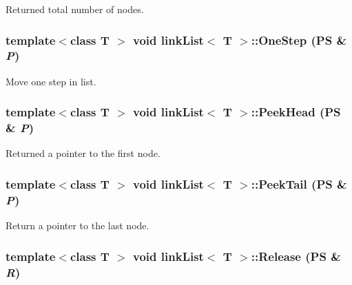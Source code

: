 Returned total number of nodes. \hypertarget{classlink_list_a2b549aa4a51e457cb8e0ef19e35978f3}{
\subsubsection[{OneStep}]{\setlength{\rightskip}{0pt plus 5cm}template$<$class T $>$ void {\bf linkList}$<$ T $>$::OneStep ({\bf PS} \& {\em P})}}
\label{classlink_list_a2b549aa4a51e457cb8e0ef19e35978f3}


Move one step in list. \hypertarget{classlink_list_a7a7cc9e8690c7e9c73d5b406cae066d3}{
\subsubsection[{PeekHead}]{\setlength{\rightskip}{0pt plus 5cm}template$<$class T $>$ void {\bf linkList}$<$ T $>$::PeekHead ({\bf PS} \& {\em P})}}
\label{classlink_list_a7a7cc9e8690c7e9c73d5b406cae066d3}


Returned a pointer to the first node. \hypertarget{classlink_list_a54c57c0f1491cca11b810c658d386c3a}{
\subsubsection[{PeekTail}]{\setlength{\rightskip}{0pt plus 5cm}template$<$class T $>$ void {\bf linkList}$<$ T $>$::PeekTail ({\bf PS} \& {\em P})}}
\label{classlink_list_a54c57c0f1491cca11b810c658d386c3a}


Return a pointer to the last node. \hypertarget{classlink_list_a24a989f008cb02dd4e452f4e5479d5cb}{
\subsubsection[{Release}]{\setlength{\rightskip}{0pt plus 5cm}template$<$class T $>$ void {\bf linkList}$<$ T $>$::Release ({\bf PS} \& {\em R})}}
\label{classlink_list_a24a989f008cb02dd4e452f4e5479d5cb}


